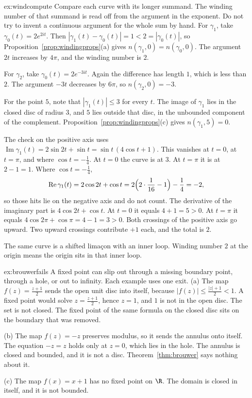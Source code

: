 \begin{solution}{ex:windcompute}
\idea Compare each curve with its longer summand. The winding number of that summand is read off from the argument in the exponent. Do not try to invent a continuous argument for the whole sum by hand.
\writeup For $\gamma_1$, take $\gamma_0(t)=2e^{2it}$. Then $|\gamma_1(t)-\gamma_0(t)|=1<2=|\gamma_0(t)|$, so Proposition~\ref{prop:windingprops}(a) gives $n(\gamma_1,0)=n(\gamma_0,0)$. The argument $2t$ increases by $4\pi$, and the winding number is $2$.

For $\gamma_2$, take $\gamma_0(t)=2e^{-3it}$. Again the difference has length $1$, which is less than $2$. The argument $-3t$ decreases by $6\pi$, so $n(\gamma_2,0)=-3$.

For the point $5$, note that $|\gamma_1(t)|\le3$ for every $t$. The image of $\gamma_1$ lies in the closed disc of radius $3$, and $5$ lies outside that disc, in the unbounded component of the complement. Proposition~\ref{prop:windingprops}(c) gives $n(\gamma_1,5)=0$.

The check on the positive axis uses $\operatorname{Im}\gamma_1(t)=2\sin 2t+\sin t=\sin t\,(4\cos t+1)$. This vanishes at $t=0$, at $t=\pi$, and where $\cos t=-\frac14$. At $t=0$ the curve is at $3$. At $t=\pi$ it is at $2-1=1$. Where $\cos t=-\frac14$,
\[
\operatorname{Re}\gamma_1(t)=2\cos 2t+\cos t=2\Bigl(2\cdot\frac1{16}-1\Bigr)-\frac14=-2,
\]
so those hits lie on the negative axis and do not count. The derivative of the imaginary part is $4\cos 2t+\cos t$. At $t=0$ it equals $4+1=5>0$. At $t=\pi$ it equals $4\cos 2\pi+\cos\pi=4-1=3>0$. Both crossings of the positive axis go upward. Two upward crossings contribute $+1$ each, and the total is $2$.

The same curve is a shifted lima\c con with an inner loop. Winding number $2$ at the origin means the origin sits in that inner loop.
\end{solution}

\begin{solution}{ex:brouwerfails}
\idea A fixed point can slip out through a missing boundary point, through a hole, or out to infinity. Each example uses one exit.
\writeup (a) The map $f(z)=\frac{z+1}2$ sends the open unit disc into itself, because $|f(z)|\le\frac{|z|+1}2<1$. A fixed point would solve $z=\frac{z+1}2$, hence $z=1$, and $1$ is not in the open disc. The set is not closed. The fixed point of the same formula on the closed disc sits on the boundary that was removed.

(b) The map $f(z)=-z$ preserves modulus, so it sends the annulus onto itself. The equation $-z=z$ holds only at $z=0$, which lies in the hole. The annulus is closed and bounded, and it is not a disc. Theorem~\ref{thm:brouwer} says nothing about it.

(c) The map $f(x)=x+1$ has no fixed point on $\R$. The domain is closed in itself, and it is not bounded.
\end{solution}

